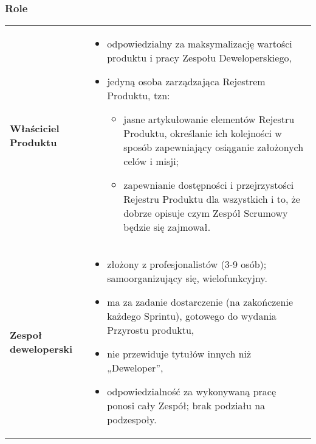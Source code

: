 \documentclass[../main.tex]{subfiles}
\begin{document}
    \subsubsection{Role}
    \begin{table}[H]
        \begin{center}
            \begin{tabular}{ p{} p{} }
                \textbf{Właściciel Produktu}
                &
                \begin{itemize}
                    \item odpowiedzialny za maksymalizację wartości produktu i pracy Zespołu
                    Deweloperskiego,
                    \item jedyną osoba zarządzająca Rejestrem Produktu, tzn:
                    \begin{itemize}
                        \item jasne artykułowanie elementów Rejestru Produktu, określanie
                        ich kolejności w sposób zapewniający osiąganie założonych celów i misji;
                        \item zapewnianie dostępności i przejrzystości Rejestru Produktu dla wszystkich i to, że dobrze opisuje czym
                        Zespół Scrumowy będzie się zajmował.
                    \end{itemize}
                \end{itemize}
                \\

                \cmidrule(r){1-1}\cmidrule(l){2-2}
                \textbf{Zespoł deweloperski}
                &
                \begin{itemize}
                    \item złożony z profesjonalistów (3-9 osób); samoorganizujący się, wielofunkcyjny.
                    \item ma za zadanie dostarczenie (na zakończenie
                    każdego Sprintu), gotowego do wydania Przyrostu produktu,
                    \item nie przewiduje tytułów innych niż „Deweloper”,
                    \item odpowiedzialność za wykonywaną pracę ponosi cały Zespół; brak podziału na podzespoły.
                \end{itemize}
                \\


\end{tabular}
\end{center}
\end{table}
\end{document}
